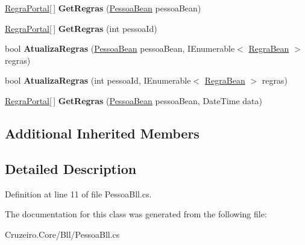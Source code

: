 \begin{DoxyCompactItemize}
\item 
\hyperlink{class_cruzeiro_1_1_core_1_1_model_1_1_regra_portal}{Regra\+Portal}\mbox{[}$\,$\mbox{]} {\bfseries Get\+Regras} (\hyperlink{class_cruzeiro_1_1_core_1_1_model_1_1_beans_1_1_pessoa_bean}{Pessoa\+Bean} pessoa\+Bean)\hypertarget{class_cruzeiro_1_1_core_1_1_bll_1_1_pessoa_bll_ae8873c0dfca7538bee84501a56ab1df5}{}\label{class_cruzeiro_1_1_core_1_1_bll_1_1_pessoa_bll_ae8873c0dfca7538bee84501a56ab1df5}

\item 
\hyperlink{class_cruzeiro_1_1_core_1_1_model_1_1_regra_portal}{Regra\+Portal}\mbox{[}$\,$\mbox{]} {\bfseries Get\+Regras} (int pessoa\+Id)\hypertarget{class_cruzeiro_1_1_core_1_1_bll_1_1_pessoa_bll_adaa9529ae8375363dd4932734e3692bb}{}\label{class_cruzeiro_1_1_core_1_1_bll_1_1_pessoa_bll_adaa9529ae8375363dd4932734e3692bb}

\item 
bool {\bfseries Atualiza\+Regras} (\hyperlink{class_cruzeiro_1_1_core_1_1_model_1_1_beans_1_1_pessoa_bean}{Pessoa\+Bean} pessoa\+Bean, I\+Enumerable$<$ \hyperlink{class_cruzeiro_1_1_core_1_1_model_1_1_beans_1_1_regra_bean}{Regra\+Bean} $>$ regras)\hypertarget{class_cruzeiro_1_1_core_1_1_bll_1_1_pessoa_bll_a9a65814f0ccd4a860199f58d2a531850}{}\label{class_cruzeiro_1_1_core_1_1_bll_1_1_pessoa_bll_a9a65814f0ccd4a860199f58d2a531850}

\item 
bool {\bfseries Atualiza\+Regras} (int pessoa\+Id, I\+Enumerable$<$ \hyperlink{class_cruzeiro_1_1_core_1_1_model_1_1_beans_1_1_regra_bean}{Regra\+Bean} $>$ regras)\hypertarget{class_cruzeiro_1_1_core_1_1_bll_1_1_pessoa_bll_a8052adf3bdeea67df09e0e433bd158a0}{}\label{class_cruzeiro_1_1_core_1_1_bll_1_1_pessoa_bll_a8052adf3bdeea67df09e0e433bd158a0}

\item 
\hyperlink{class_cruzeiro_1_1_core_1_1_model_1_1_regra_portal}{Regra\+Portal}\mbox{[}$\,$\mbox{]} {\bfseries Get\+Regras} (\hyperlink{class_cruzeiro_1_1_core_1_1_model_1_1_beans_1_1_pessoa_bean}{Pessoa\+Bean} pessoa\+Bean, Date\+Time data)\hypertarget{class_cruzeiro_1_1_core_1_1_bll_1_1_pessoa_bll_ab724bf03ac1e59cb4c378f4c48d8bbd1}{}\label{class_cruzeiro_1_1_core_1_1_bll_1_1_pessoa_bll_ab724bf03ac1e59cb4c378f4c48d8bbd1}

\end{DoxyCompactItemize}
\subsection*{Additional Inherited Members}


\subsection{Detailed Description}


Definition at line 11 of file Pessoa\+Bll.\+cs.



The documentation for this class was generated from the following file\+:\begin{DoxyCompactItemize}
\item 
Cruzeiro.\+Core/\+Bll/Pessoa\+Bll.\+cs\end{DoxyCompactItemize}
